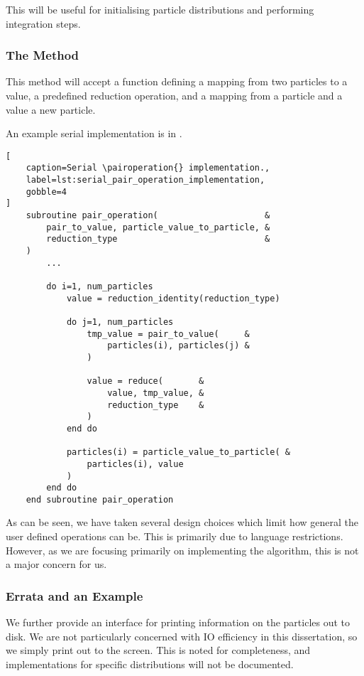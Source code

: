 This will be useful for initialising particle distributions
and performing integration steps.


\subsubsection{The \pairoperation{} Method}
\label{sec:the_pair_operation_method}

This method will accept a function defining a mapping from two
particles to a value, a predefined reduction operation, and
a mapping from a particle and a value a new particle.

An example serial implementation is in
.

\begin{lstlisting}[
    caption=Serial \pairoperation{} implementation.,
    label=lst:serial_pair_operation_implementation,
    gobble=4
]
    subroutine pair_operation(                     &
        pair_to_value, particle_value_to_particle, &
        reduction_type                             &
    )
        ...

        do i=1, num_particles
            value = reduction_identity(reduction_type)

            do j=1, num_particles
                tmp_value = pair_to_value(     &
                    particles(i), particles(j) &
                )

                value = reduce(       &
                    value, tmp_value, &
                    reduction_type    & 
                )
            end do

            particles(i) = particle_value_to_particle( &
                particles(i), value
            )
        end do
    end subroutine pair_operation
\end{lstlisting}

As can be seen, we have taken several design choices which limit how
general the user defined operations can be.
%
This is primarily due to language restrictions.
%
However, as we are focusing primarily on implementing
the \velocityverlet{} algorithm, this is not a major concern for us.


\subsubsection{Errata and an Example}

We further provide an interface for printing information on the particles
out to disk.
%
We are not particularly concerned with IO efficiency in this dissertation,
so we simply print out to the screen.
%
This is noted for completeness, and implementations for specific distributions
will not be documented.

